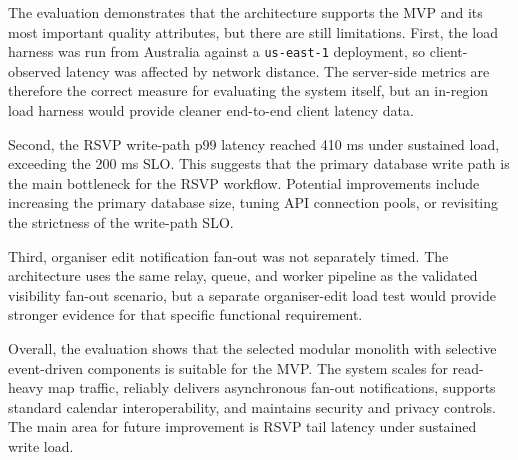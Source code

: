 The evaluation demonstrates that the architecture supports the MVP and its most important quality attributes, but there are still limitations. First, the load harness was run from Australia against a \texttt{us-east-1} deployment, so client-observed latency was affected by network distance. The server-side metrics are therefore the correct measure for evaluating the system itself, but an in-region load harness would provide cleaner end-to-end client latency data.

Second, the RSVP write-path p99 latency reached 410 ms under sustained load, exceeding the 200 ms SLO. This suggests that the primary database write path is the main bottleneck for the RSVP workflow. Potential improvements include increasing the primary database size, tuning API connection pools, or revisiting the strictness of the write-path SLO.

Third, organiser edit notification fan-out was not separately timed. The architecture uses the same relay, queue, and worker pipeline as the validated visibility fan-out scenario, but a separate organiser-edit load test would provide stronger evidence for that specific functional requirement.

Overall, the evaluation shows that the selected modular monolith with selective event-driven components is suitable for the MVP. The system scales for read-heavy map traffic, reliably delivers asynchronous fan-out notifications, supports standard calendar interoperability, and maintains security and privacy controls. The main area for future improvement is RSVP tail latency under sustained write load.
